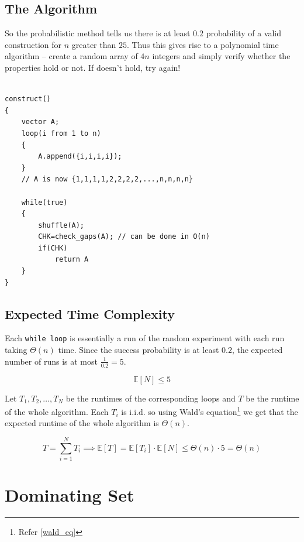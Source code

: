 \subsection{The Algorithm}
So the probabilistic method tells us there is at least $0.2$ probability of a valid construction for $n$ 
greater than $25$. Thus this gives rise to a polynomial time algorithm -- create a 
random array of $4n$ integers and simply verify whether the properties hold or not. If doesn't hold, try again!

\begin{center}
\begin{minipage}{0.9\linewidth}
\begin{framed}
\begin{Verbatim}

construct()
{
    vector A;
    loop(i from 1 to n)
    {
        A.append({i,i,i,i});
    }
    // A is now {1,1,1,1,2,2,2,2,...,n,n,n,n}

    while(true)
    {
        shuffle(A);
        CHK=check_gaps(A); // can be done in O(n)
        if(CHK)
            return A
    }
}
\end{Verbatim}
\vspace{-4mm}
\end{framed}
\end{minipage}
\end{center}

\subsection{Expected Time Complexity}

Each \texttt{while loop} is essentially a run of the random experiment with each run taking $\Theta(n)$ time.
Since the success probability is at least $0.2$, the expected number of runs is at most $\frac{1}{0.2} = 5$. 

\[
\mathbb E[N] \le 5
\]

Let $T_1,T_2,\dots,T_N$ be the runtimes of the corresponding loops and $T$ be the runtime of the 
whole algorithm. Each $T_i$ is i.i.d. so using Wald's equation\footnote{Refer \autoref{wald_eq}} we get 
that the expected runtime of the whole algorithm is $\Theta(n)$.

\[
T=\sum_{i=1}^{N}T_i
\implies
\mathbb E[T]=\mathbb E[T_i]\cdot \mathbb E[N] \le \Theta(n) \cdot 5 = \Theta(n)
\]

\section{Dominating Set}

